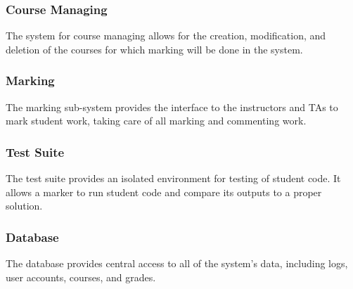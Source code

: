 \documentclass{article}
\begin{document}
\subsubsection{Course Managing}
The system for course managing allows for the creation, modification, and deletion
of the courses for which marking will be done in the system.
\subsubsection{Marking}
The marking sub-system provides the interface to the instructors and TAs to mark
student work, taking care of all marking and commenting work.
\subsubsection{Test Suite}
The test suite provides an isolated environment for testing of student code. It allows a
marker to run student code and compare its outputs to a proper solution.
\subsubsection{Database}
The database provides central access to all of the system's data, including logs,
user accounts, courses, and grades.
\end{document}
